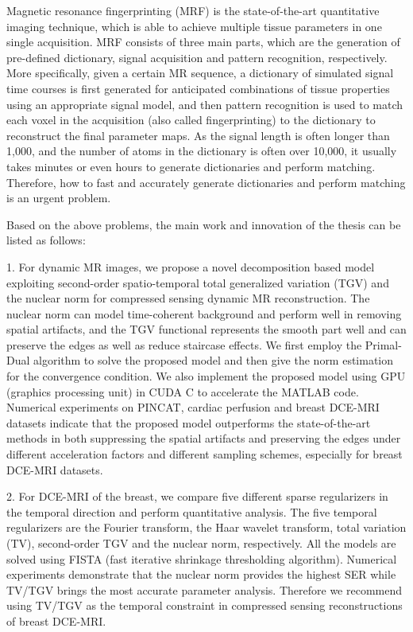 \begin{englishabstract}
Magnetic resonance fingerprinting (MRF) is the state-of-the-art quantitative imaging technique, which is able to achieve multiple tissue parameters in one single acquisition. MRF consists of three main parts, which are the generation of pre-defined dictionary, signal acquisition and pattern recognition, respectively. More specifically, given a certain MR sequence, a dictionary of simulated signal time courses is first generated for anticipated combinations of tissue properties using an appropriate signal model, and then pattern recognition is used to match each voxel in the acquisition (also called fingerprinting) to the dictionary to reconstruct the final parameter maps. As the signal length is often longer than 1,000, and the number of atoms in the dictionary is often over 10,000, it usually takes minutes or even hours to generate dictionaries and perform matching. Therefore, how to fast and accurately generate dictionaries and perform matching is an urgent problem.

Based on the above problems, the main work and innovation of the thesis can be listed as follows:

1. For dynamic MR images, we propose a novel decomposition based model exploiting second-order spatio-temporal total generalized variation (TGV) and the nuclear norm for compressed sensing dynamic MR reconstruction. The nuclear norm can model time-coherent background and perform well in removing spatial artifacts, and the TGV functional represents the smooth part well and can preserve the edges as well as reduce staircase effects. We first employ the Primal-Dual algorithm to solve the proposed model and then give the norm estimation for the convergence condition. We also implement the proposed model using GPU (graphics processing unit) in CUDA C to accelerate the MATLAB code. Numerical experiments on PINCAT, cardiac perfusion and breast DCE-MRI datasets indicate that the proposed model outperforms the state-of-the-art methods in both suppressing the spatial artifacts and preserving the edges under different acceleration factors and different sampling schemes, especially for breast DCE-MRI datasets.

2. For DCE-MRI of the breast, we compare five different sparse regularizers in the temporal direction and perform quantitative analysis. The five temporal regularizers are the Fourier transform, the Haar wavelet transform, total variation (TV), second-order TGV and the nuclear norm, respectively. All the models are solved using FISTA (fast iterative shrinkage thresholding algorithm). Numerical experiments demonstrate that the nuclear norm provides the highest SER while TV/TGV brings the most accurate parameter analysis. Therefore we recommend using TV/TGV as the temporal constraint in compressed sensing reconstructions of breast DCE-MRI.


\end{englishabstract}

